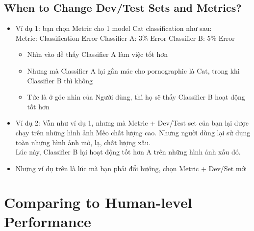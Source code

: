 \documentclass[12pt,a4paper]{report}
\begin{document}
	\section{When to Change Dev/Test Sets and Metrics?}
		\begin{itemize}
			\item Ví dụ 1: bạn chọn Metric cho 1 model Cat classification như 
			sau:\\
			\tabto{0.5cm} Metric: Classification Error
			\tabto{0.5cm} Classifier A: 3\% Error
			\tabto{0.5cm} Classifier B: 5\% Error
				\begin{itemize}
					\item Nhìn vào dễ thấy Classifier A làm việc tốt hơn
					\item Nhưng mà Classifier A lại gắn mác cho pornographic 
					là Cat, trong khi Classifier B thì không
					\item Tức là ở góc nhìn của Người dùng, thì họ sẽ thấy 
					Classifier B hoạt động tốt hơn
				\end{itemize}
			\item Ví dụ 2: Vẫn như ví dụ 1, nhưng mà Metric + Dev/Test set của 
			bạn lại được chạy trên những hình ảnh Mèo chất lượng cao. Nhưng 
			người dùng lại sử dụng toàn những hình ảnh mờ, lạ, chất lượng xấu.
			\\ Lúc này, Classifier B lại hoạt động tốt hơn A trên những hình 
			ảnh xấu đó.
			\item Những ví dụ trên là lúc mà bạn phải đổi hướng, chọn Metric 
			+ Dev/Set mới
		\end{itemize}
\chapter{Comparing to Human-level Performance}
\end{document}
